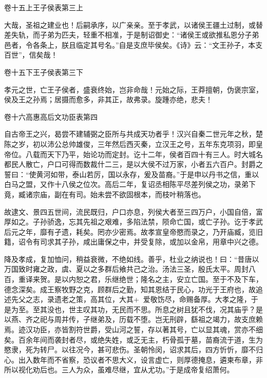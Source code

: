 \documentclass[12pt,UTF8]{ctexbook}
\begin{document}
卷十五上王子侯表第三上



大哉，圣祖之建业也！后嗣承序，以广亲亲。至于孝武，以诸侯王疆土过制，或替差失轨，而子弟为匹夫，轻重不相准，于是制诏御史：“诸侯王或欲推私恩分子弟邑者，令各条上，朕且临定其号名。”自是支庶毕侯矣。《诗》云：“文王孙子，本支百世”，信矣哉！





卷十五下王子侯表第三下



孝元之世，亡王子侯者，盛衰终始，岂非命哉！元始之际，王莽擅朝，伪褒宗室，侯及王之孙焉；居摄而愈多，非其正，故弗录。旋踵亦绝，悲夫！





卷十六高惠高后文功臣表第四



自古帝王之兴，曷尝不建辅弼之臣所与共成天功者乎！汉兴自秦二世元年之秋，楚陈之岁，初以沛公总帅雄俊，三年然后西灭秦，立汉王之号，五年东克项羽，即皇帝位。八载而天下乃平，始论功而定封。讫十二年，侯者百四十有三人。时大城名都民人散亡，户口可得而数裁什二三，是以大侯不过万家，小者五六百户。封爵之誓曰：“使黄河如带，泰山若厉，国以永存，爰及苗裔。”于是申以丹书之信，重以白马之盟，又作十八侯之位次。高后二年，复诏丞相陈平尽差列侯之功，录弟下竟，臧诸宗庙，副在有司。始未尝不欲固根本，而枝叶稍落也。



故逮文、景四五世间，流民既归，户口亦息，列侯大者至三四万户，小国自倍，富厚如之。子孙骄逸，忘其先祖之艰难，多陷法禁，陨命亡国，或亡子孙。讫于孝武后元之年，靡有孑遗，耗矣。罔亦少密焉。故孝宣皇帝愍而录之，乃开庙臧，览旧籍，诏令有司求其子孙，咸出庸保之中，并受复除，或加以金帛，用章中兴之德。



降及孝成，复加恤问，稍益衰微，不绝如线。善乎，杜业之纳说也！曰：“昔唐以万国致时雍之政，虞、夏以之多群后飨共己之治。汤法三圣，殷氏太平。周封八百，重译来贺。是以内恕之君，乐继绝世；隆名之主，安立亡国。至于不及下车，德念深矣。成王察牧野之克，顾群后之勤，知其恩结于民心，功光于王府也，故追述先父之志，录遗老之策，高其位，大其+，爱敬饬尽，命赐备厚。大孝之隆，于是为至。至其没也，世主叹其功，无民而不思。所息之树且犹不伐，况其庙乎？是以燕、齐之祀与周并传，子继弟及，历载不堕。岂无刑辟，繇祖之竭力，故支庶赖焉。迹汉功臣，亦皆割符世爵，受山河之誓，存以著其号，亡以显其魂，赏亦不细矣。百余年间而袭封者尽，或绝失姓，或乏无主，朽骨孤于墓，苗裔流于道，生为愍隶，死为转尸。以往况今，甚可悲伤。圣朝怜闵，诏求其后，四方忻忻，靡不归心。出入数年而不省察，恐议者不思大义，设言虚亡，则厚德掩息，遴柬布章，非所以视化劝后也。三人为众，虽难尽继，宜从尤功。”于是成帝复绍萧何。
\end{document}
